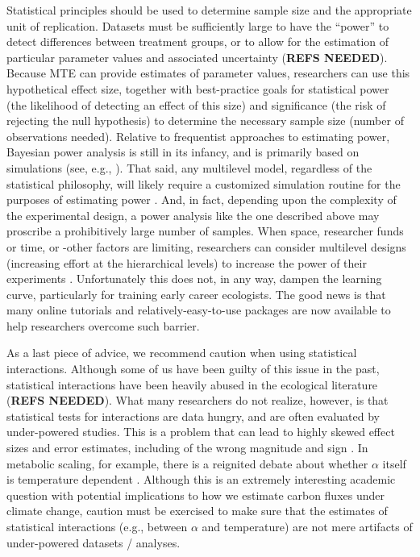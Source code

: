 \documentclass[a4paper,12pt]{article}
\begin{document}
Statistical principles should be used to determine sample size and the appropriate unit of replication. Datasets must be sufficiently large to have the ``power'' to detect differences between treatment groups, or to allow for the estimation of particular parameter values and associated uncertainty (\textbf{REFS NEEDED}). Because MTE can provide estimates of parameter values, researchers can use this hypothetical effect size, together with best-practice goals for statistical power (the likelihood of detecting an effect of this size) and significance (the risk of rejecting the null hypothesis) to determine the necessary sample size (number of observations needed). Relative to frequentist approaches to estimating power, Bayesian power analysis is still in its infancy, and is primarily based on simulations (see, e.g., \cite{schonbrodt2018psybullrev, kruscke2018psybullrev, fisher2019mee}). That said, any multilevel model, regardless of the statistical philosophy, will likely require a customized simulation routine for the purposes of estimating power \cite{scherbaum2009orgresmet}. And, in fact, depending upon the complexity of the experimental design, a power analysis like the one described above may proscribe a prohibitively large number of samples. When space, researcher funds or time, or -other factors are limiting, researchers can consider multilevel designs (increasing effort at the hierarchical levels) to increase the power of their experiments \cite{scherbaum2009orgresmet}. Unfortunately this does not, in any way, dampen the learning curve, particularly for training early career ecologists. The good news is that many online tutorials and relatively-easy-to-use packages are now available to help researchers overcome such barrier.

As a last piece of advice, we recommend caution when using statistical interactions. Although some of us have been guilty of this issue in the past, statistical interactions have been heavily abused in the ecological literature (\textbf{REFS NEEDED}). What many researchers do not realize, however, is that statistical tests for interactions are data hungry, and are often evaluated by under-powered studies. This is a problem that can lead to highly skewed effect sizes and error estimates, including of the wrong magnitude and sign \cite{gelman2014perspsysci}. In metabolic scaling, for example, there is a reignited debate about whether $\alpha$ itself is temperature dependent \cite{glazier2020jcompphysiolb}. Although this is an extremely interesting academic question with potential implications to how we estimate carbon fluxes under climate change, caution must be exercised to make sure that the estimates of statistical interactions (e.g., between $\alpha$ and temperature) are not mere artifacts of under-powered datasets / analyses.
\end{document}
